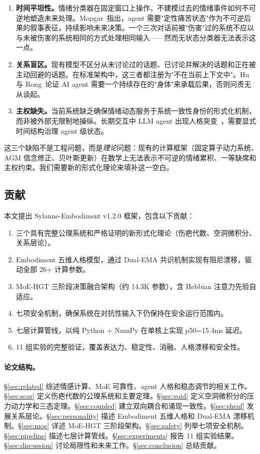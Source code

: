 \documentclass[11pt]{article}
\begin{document}
\begin{enumerate}[leftmargin=*]
\item \textbf{时间平坦性。}情绪分类器在固定窗口上操作，不建模过去的情绪事件如何不可逆地塑造未来处理。Mopgar~\cite{mopgar2026}指出，agent 需要"定性痛苦状态"作为不可逆后果的叙事表征，持续影响未来决策。一个三次对话前被"伤害"过的系统不应以与未被伤害的系统相同的方式处理相同输入——然而无状态分类器无法表示这一点。

\item \textbf{关系盲区。}现有模型不区分从未讨论过的话题、已讨论并解决的话题和正在被主动回避的话题。在标准架构中，这三者都注册为"不在当前上下文中"。Hu 与 Rong~\cite{hu2026}论证 AI agent 需要一个持续存在的"身体"来承载后果，否则问责无从谈起。

\item \textbf{主权缺失。}当前系统缺乏确保情绪动态服务于系统一致性身份的形式化机制，而非被外部无限制地操纵。长期交互中 LLM agent 出现人格突变~\cite{structured2025}，需要显式时间结构治理 agent 级状态。
\end{enumerate}

这三个缺陷不是工程问题，而是\emph{理论}问题：现有的计算框架（固定算子动力系统、AGM 信念修正、贝叶斯更新）在数学上无法表示不可逆的情绪累积、一等缺席和主权约束。我们需要新的形式化理论来填补这一空白。

\subsection{贡献}

本文提出 Sylanne-Embodiment v1.2.0 框架，包含以下贡献：

\begin{enumerate}[leftmargin=*]
\item 三个具有完整公理系统和严格证明的新形式化理论（伤疤代数、空洞微积分、关系层论）。
\item Embodiment 五维人格模型，通过 Dual-EMA 共识机制实现有阻尼漂移，驱动全部 26+ 计算参数。
\item MoE-HGT 三阶段决策融合架构（约 14.3K 参数），含 Hebbian 注意力先验自适应。
\item 七项安全机制，确保系统在对抗性输入下仍保持在安全运行范围内。
\item 七层计算管线，以纯 Python + NumPy 在单核上实现 p50=15.4ms 延迟。
\item 11 组实验的完整验证，覆盖表达力、稳定性、消融、人格漂移和安全性。
\end{enumerate}

\paragraph{论文结构。}
\S\ref{sec:related} 综述情感计算、MoE 可靠性、agent 人格和稳态调节的相关工作。\S\ref{sec:scar} 定义伤疤代数的公理系统和主要定理。\S\ref{sec:void} 定义空洞微积分的压力动力学和三态定理。\S\ref{sec:coupled} 建立双向耦合和涌现一致性。\S\ref{sec:sheaf} 发展关系层论。\S\ref{sec:personality} 描述 Embodiment 五维人格和 Dual-EMA 漂移机制。\S\ref{sec:moe} 详述 MoE-HGT 三阶段架构。\S\ref{sec:safety} 列举七项安全机制。\S\ref{sec:pipeline} 描述七层计算管线。\S\ref{sec:experiments} 报告 11 组实验结果。\S\ref{sec:discussion} 讨论局限性和未来工作。\S\ref{sec:conclusion} 总结贡献。
\end{document}
